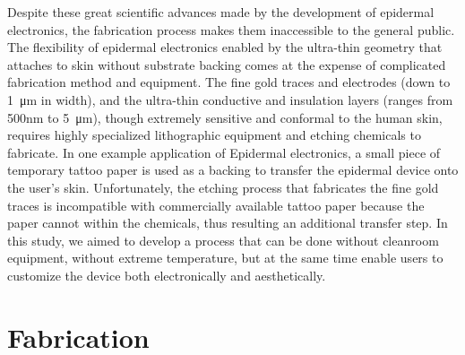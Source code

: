 \documentclass{sigchi}
\begin{document}
Despite these great%
 scientific advances made by the development of epidermal electronics, the fabrication process makes them inaccessible to the general public. The flexibility of epidermal electronics enabled by the ultra-thin geometry that attaches to skin without substrate backing comes at the expense of complicated fabrication method and equipment. The fine gold traces and electrodes (down to \SI{1}{\micro\metre} in width), and the ultra-thin conductive and insulation layers (ranges from 500nm to 5\SI{}{\micro\metre}), though extremely sensitive and conformal to the human skin, requires highly specialized lithographic equipment and etching chemicals to fabricate. In one example application of Epidermal electronics, a small piece of temporary tattoo paper is used as a backing to transfer the epidermal device onto the user's skin. Unfortunately, the etching process that fabricates the fine gold traces is incompatible with commercially available tattoo paper because the paper cannot %
 within the chemicals, thus resulting an additional transfer step. In this study, we aimed to develop a process that can be done without cleanroom equipment, without
 extreme temperature, but at the same time enable users to customize the device both electronically and aesthetically. 
 

\section{Fabrication}
\end{document}
